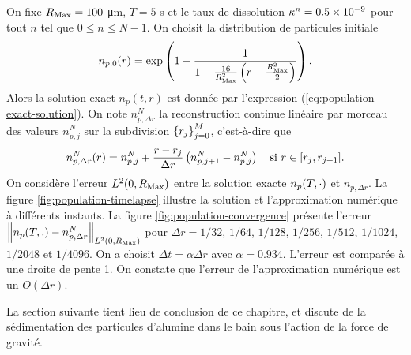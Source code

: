 On fixe $R_\mathrm{Max} = \num{100}$ \si{\micro\meter}, $T = 5$ \si{\second} et
le taux de dissolution
$\kappa^n = \num{0.5e-9}$ pour tout $n$ tel que $0\leq n\leq
N-1$. On choisit la distribution de particules initiale
\begin{equation}\label{eq:population-test-ic}
  n_{p,0}(r) = \exp\left( 1 - \frac{1}{1 - \frac{16}{R_\mathrm{Max}^2}\left( r - \frac{R_\mathrm{Max}^2}{2} \right)} \right).
\end{equation}
Alors la solution exact $n_p(t, r)$ est donnée par l'expression
(\ref{eq:population-exact-solution}). On note $n_{p,\Delta r}^N$ la
reconstruction continue linéaire par morceau des valeurs $n_{p,j}^N$
sur la subdivision $\left\{ r_j \right\}_{j=0}^M$, c'est-à-dire que
\begin{equation}
  n_{p,\Delta r}^N(r) = n_{p,j}^N + \frac{r - r_j}{\Delta
    r}\left( n_{p,j+1}^N - n_{p,j}^N \right)\quad \text{si } r\in[r_j, r_{j+1}].
\end{equation}
On considère l'erreur $L^2(0,R_\mathrm{Max})$ entre la solution exacte
$n_p(T, \cdot)$ et $n_{p,\Delta r}$. La figure
\ref{fig:population-timelapse} illustre la solution et l'approximation
numérique à différents instants. La figure
\ref{fig:population-convergence} présente l'erreur $\left\lVert n_p(T, .) -
  n_{p,\Delta r}^N \right\rVert_{L^2(0,R_\mathrm{Max})}$ pour $\Delta r = 1/32$, $1/64$,
$1/128$, $1/256$, $1/512$, $1/1024$, $1/2048$ et $1/4096$. On a
choisit $\Delta t = \alpha\Delta r$ avec $\alpha =
\num{0.934}$. L'erreur est comparée à une droite de pente 1. On
constate que l'erreur de l'approximation numérique est un $O(\Delta
r)$.

La section suivante tient lieu de conclusion de ce chapitre, et discute
de la sédimentation des particules d'alumine dans le bain sous
l'action de la force de gravité.
